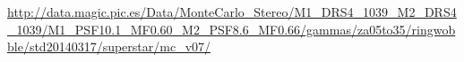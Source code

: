 \url{http://data.magic.pic.es/Data/MonteCarlo_Stereo/M1_DRS4_1039_M2_DRS4_1039/M1_PSF10.1_MF0.60_M2_PSF8.6_MF0.66/gammas/za05to35/ringwobble/std20140317/superstar/mc_v07/}



% 
% 
% 
% 
% 
% 
% 
